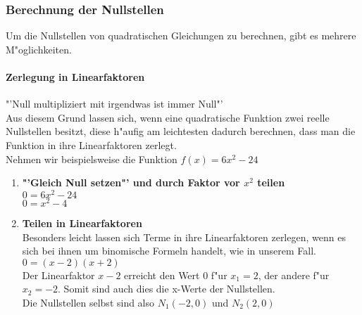 \subsubsection{Berechnung der Nullstellen}
Um die Nullstellen von quadratischen Gleichungen zu berechnen, gibt es mehrere M"oglichkeiten.\\

\paragraph{Zerlegung in Linearfaktoren}\hspace{12 cm}
"'Null multipliziert mit irgendwas ist immer Null"'\\
Aus diesem Grund lassen sich, wenn eine quadratische Funktion zwei reelle Nullstellen besitzt, diese h"aufig am leichtesten dadurch berechnen, dass man die Funktion in ihre Linearfaktoren zerlegt.\vspace{0.5 cm}\\
Nehmen wir beispielsweise die Funktion $f(x)=6x^2 - 24$\\
\begin{enumerate}
\item \textbf{"'Gleich Null setzen"' und durch Faktor vor $x^2$ teilen}\\
$0=6x^2 - 24$\\
$0=x^2 - 4$
\item \textbf{Teilen in Linearfaktoren}\\
Besonders leicht lassen sich Terme in ihre Linearfaktoren zerlegen, wenn es sich bei ihnen um binomische Formeln handelt, wie in unserem Fall.\\
$0=(x-2)(x+2)$\\
Der Linearfaktor $x-2$ erreicht den Wert 0 f"ur $x_1=2$, der andere f"ur $x_2=-2$. Somit sind auch dies die x-Werte der Nullstellen.\\
Die Nullstellen selbst sind also $N_1(-2,0)$ und $N_2(2,0)$
\end{enumerate}

